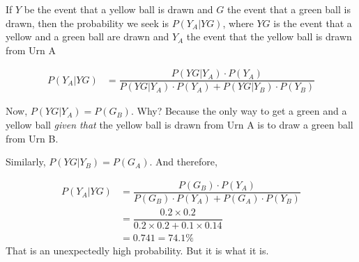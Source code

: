 \begin{solution}[\fullpage]
   If $Y$ be the event that a yellow ball is drawn and $G$ the event that a green ball is 
   drawn, then the probability we seek is $P(Y_A \vert YG)$, where $YG$ is the event
   that a yellow and a green ball are drawn and $Y_A$ the event that the yellow ball is 
   drawn from Urn A
   
   \begin{align}
      P(Y_A \vert YG) &= \dfrac{P(YG \vert Y_A)\cdot P(Y_A)}{P(YG \vert Y_A)\cdot P(Y_A) + P(YG \vert Y_B)\cdot P(Y_B)}
   \end{align}
   
   Now, $P(YG \vert Y_A) = P(G_B)$. Why? Because the only way to get a green and a yellow ball 
   \textit{given that} the yellow ball is drawn from Urn A is to draw a green ball from Urn B.
   
   Similarly, $P(YG \vert Y_B) = P(G_A)$. And therefore, 
   
   \begin{align}
       P(Y_A \vert YG) &= \dfrac{P(G_B)\cdot P(Y_A)}{P(G_B)\cdot P(Y_A) + P(G_A)\cdot P(Y_B)} \\
                       &= \dfrac{0.2 \times 0.2}{0.2\times 0.2 + 0.1\times 0.14} \\
                       &= 0.741 = 74.1\%
   \end{align}
   That is an unexpectedly high probability. But it is what it is.
\end{solution}

